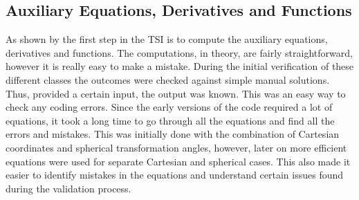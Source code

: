 \subsection{Auxiliary Equations, Derivatives and Functions}
\label{subsec:auxEqDerFunverval}
As shown by  the first step in the \ac{TSI} is to compute the auxiliary equations, derivatives and functions. The computations, in theory, are fairly straightforward, however it is really easy to make a mistake. During the initial verification of these different classes the outcomes were checked against simple manual solutions. Thus, provided a certain input, the output was known. This was an easy way to check any coding errors. Since the early versions of the code required a lot of equations, it took a long time to go through all the equations and find all the errors and mistakes. This was initially done with the combination of Cartesian coordinates and spherical transformation angles, however, later on more efficient equations were used for separate Cartesian and spherical cases. This also made it easier to identify mistakes in the equations and understand certain issues found during the validation process. 

